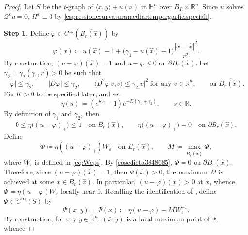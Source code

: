 \documentclass[11pt]{amsart}
\renewcommand{\leq}{\leqslant}
\renewcommand{\ge}{>}
\newcommand{\rr}{{\mathbb{R}}}
\newcommand{\hh}{{\mathbb{H}}}
\newcommand{\eps}{\varepsilon}
\newcommand{\We}{W_\eps}
\newcommand{\Qe}{\mathcal Q^\eps}
\theoremstyle{definition}
\theoremstyle{remark}
\numberwithin{equation}{section}
\begin{document}
\begin{proof}
   Let $S$ be the $t$-graph of $\langle x,y\rangle+u(x)$ in $\hh^n$ over $B_R\times\rr^n$. Since $u$ solves $\Qe u=0$, $H^\eps\equiv 0$ by \eqref{espressionecurvaturamediariempergarficispeciali}. 
   
   \smallskip
   \noindent \textbf{Step 1.}
   Define $\varphi\in C^\infty(\overline{B_r(\hat x)})$ by 
   \begin{equation*}
 \varphi(x)\coloneqq u(\hat x)-1+
 \bigl(\gamma_1-u(\hat x)+1\bigr)\frac{|x-\hat x|^2}{r^2}.
\end{equation*}
By construction, $(u-\varphi)(\hat x)=1$ and $u-\varphi\leq 0$ on $\partial B_r(\hat x)$. Let $\gamma_2=\gamma_2(\gamma_1,r)\ge 0$ be such that
\begin{equation*}
    |\varphi|\leq \gamma_2,\qquad |D\varphi|\leq \gamma_2,\qquad \langle D^2\varphi\,v,v\rangle\leq\gamma_2|v|^2\text{ for any }v\in\rr^n,\qquad \text{on }\overline{B_r(\hat x)}.
\end{equation*}
Fix $K\ge 0$ to be specified later, and set 
\begin{equation*}
 \eta(s)\coloneqq (e^{Ks}-1)e^{-K(\gamma_1+\gamma_2)},\qquad s\in\rr.
\end{equation*}
By definition of $\gamma_1$ and $\gamma_2,$ then 
\begin{equation}\label{cosedieta3848685}
    0\leq \eta\big((u-\varphi)_+\big)\leq 1\quad\text{on }\overline{B_r(\hat x)},\qquad  \eta\big((u-\varphi)_+\big)=0\quad\text{on }\partial B_r(\hat x).
\end{equation}
Define
\begin{equation*}
 \Phi\coloneqq
     \eta((u-\varphi)_+)W_\varepsilon\quad\text{on }\overline{B_r(\hat x)},
 \qquad M\coloneqq \max_{\overline{B_r(\hat x)}}\Phi,
\end{equation*}
where $W_{\eps}$ is defined in \eqref{eq:Weps}.
By \eqref{cosedieta3848685}, $\Phi=0$ on $\partial B_r(\hat x)$. Therefore, since $(u-\varphi)(\hat x)=1$, then $\Phi(\hat x)\ge 0$, the maximum $M$ is achieved at some $\bar x\in B_r(\hat x)$. In particular, $(u-\varphi)(\bar x)\ge 0$ at $\bar x$, whence $\Phi=
     \eta(u-\varphi)W_\varepsilon\text{ locally near }\bar x$.
Recalling the identification of , define $\Psi\in C^\infty(S)$ by
\begin{equation*}
    \Psi(x,y)=\Psi(x)\coloneqq  \eta(u-\varphi)-M\We^{-1}.
\end{equation*}
By construction, for any $y\in\rr^n$, $(\bar x,y)$ is a local maximum point of $\Psi$, whence

\end{proof}
\end{document}
